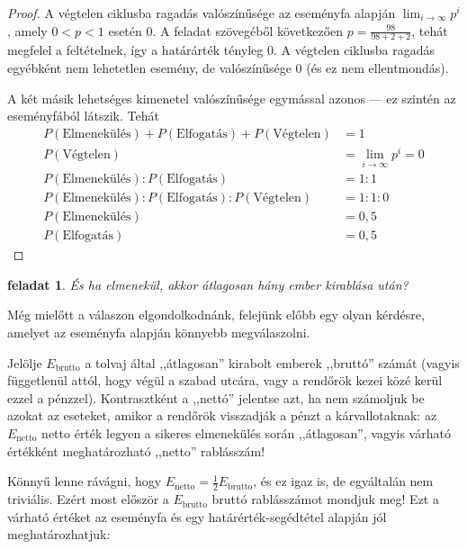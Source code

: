 \documentclass{article}
\newtheorem{task}{feladat}
\newcommand{\parenthesed}[1]{\left(#1\right)}
\newcommand{\expvalnet}{E_{\text{netto}}}
\newcommand{\expvalgro}{E_{\text{brutto}}}
\begin{document}
	\begin{proof}
		A végtelen ciklusba ragadás valószínűsége az eseményfa alapján $\lim_{i\to\infty}p^i$, amely $0 < p < 1$ esetén $0$.
		A feladat szövegéből következően $p = \frac{98}{98+2+2}$, tehát megfelel a feltételnek, így a határárték tényleg 0.
		A végtelen ciklusba ragadás egyébként nem lehetetlen esemény, de valószínűsége 0 (és ez nem ellentmondás).

		A két másik lehetséges kimenetel valószínűsége egymással azonos --- ez szintén az eseményfából látszik.
		Tehát
		\begin{align}
			P\parenthesed{\text{Elmenekülés}} + P\parenthesed{\text{Elfogatás}} + P\parenthesed{\text{Végtelen}} &= 1\\
			P\parenthesed{\text{Végtelen}} &= \lim_{i\to\infty}p^i = 0\\
			P\parenthesed{\text{Elmenekülés}} : P\parenthesed{\text{Elfogatás}} &= 1 : 1\\
			P\parenthesed{\text{Elmenekülés}} : P\parenthesed{\text{Elfogatás}} : P\parenthesed{\text{Végtelen}} &= 1 : 1 : 0\\
			P\parenthesed{\text{Elmenekülés}} &= 0,5\\
			P\parenthesed{\text{Elfogatás}} &= 0,5
		\end{align}
	\end{proof}

	\begin{task}
		És ha elmenekül, akkor átlagosan hány ember kirablása után?
	\end{task}

	Még mielőtt a válaszon elgondolkodnánk, felejünk előbb egy olyan kérdésre, amelyet az eseményfa alapján könnyebb megválaszolni.

	Jelölje $\expvalgro$ a tolvaj által ,,átlagosan'' kirabolt emberek ,,bruttó'' számát (vagyis függetlenül attól, hogy végül a szabad utcára, vagy a rendőrök kezei közé kerül ezzel a pénzzel). 		Kontrasztként a ,,nettó'' jelentse azt, ha nem számoljuk be azokat az eseteket, amikor a rendőrök visszadják a pénzt a kárvallotaknak: az $\expvalnet$ netto érték legyen a sikeres elmenekülés során ,,átlagosan'', vagyis várható értékként meghatározható ,,netto'' rablásszám!

	Könnyű lenne rávágni, hogy $\expvalnet = \frac12\expvalgro$, és ez igaz is, de egyáltalán nem triviális. Ezért most először a $\expvalgro$ bruttó rablásszámot mondjuk meg! Ezt a  várható értéket az eseményfa és egy határérték-segédtétel alapján jól meghatározhatjuk:
\end{document}
